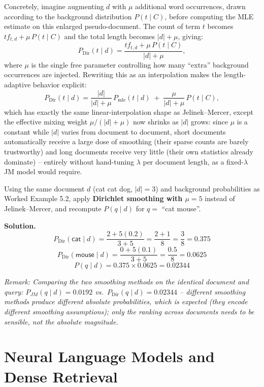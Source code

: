 \documentclass[11pt, a4paper]{article}
\newcommand{\Solution}{\medskip\noindent\textbf{\color{exgreen}Solution.}\ }
\newcommand{\Note}[1]{\par\noindent\textit{\color{darkgray}Remark: #1}\par}
\begin{document}
Concretely, imagine augmenting $d$ with $\mu$ additional word occurrences, drawn according to the background distribution $P(t\mid C)$, before computing the MLE estimate on this enlarged pseudo-document. The count of term $t$ becomes $tf_{t,d} + \mu\,P(t\mid C)$ and the total length becomes $|d|+\mu$, giving:
\[
P_{\text{Dir}}(t\mid d) = \frac{tf_{t,d} + \mu\, P(t\mid C)}{|d| + \mu},
\]
where $\mu$ is the single free parameter controlling how many ``extra'' background occurrences are injected. Rewriting this as an interpolation makes the length-adaptive behavior explicit:
\[
P_{\text{Dir}}(t\mid d) = \frac{|d|}{|d|+\mu}\,P_{\text{mle}}(t\mid d) \;+\; \frac{\mu}{|d|+\mu}\,P(t\mid C),
\]
which has exactly the same linear-interpolation shape as Jelinek--Mercer, except the effective mixing weight $\mu/(|d|+\mu)$ now shrinks as $|d|$ grows: since $\mu$ is a constant while $|d|$ varies from document to document, short documents automatically receive a large dose of smoothing (their sparse counts are barely trustworthy) and long documents receive very little (their own statistics already dominate) -- entirely without hand-tuning $\lambda$ per document length, as a fixed-$\lambda$ JM model would require.

\begin{exercisebox}
Using the same document $d$ (\textsf{cat cat dog}, $|d|=3$) and background probabilities as Worked Example 5.2, apply \textbf{Dirichlet smoothing with $\mu=5$} instead of Jelinek--Mercer, and recompute $P(q\mid d)$ for $q=$ ``\textsf{cat mouse}''.
\end{exercisebox}

\Solution
\[
P_{\text{Dir}}(\textsf{cat}\mid d) = \frac{2 + 5(0.2)}{3+5} = \frac{2+1}{8} = \frac{3}{8} = 0.375
\]
\[
P_{\text{Dir}}(\textsf{mouse}\mid d) = \frac{0 + 5(0.1)}{3+5} = \frac{0.5}{8} = 0.0625
\]
\[
P(q\mid d) = 0.375 \times 0.0625 = 0.02344
\]

\Note{Comparing the two smoothing methods on the identical document and query: $P_{JM}(q\mid d)=0.0192$ vs.\ $P_{\text{Dir}}(q\mid d)=0.02344$ -- different smoothing methods produce different absolute probabilities, which is expected (they encode different smoothing assumptions); only the \emph{ranking} across documents needs to be sensible, not the absolute magnitude.}

\section{Neural Language Models and Dense Retrieval}
\end{document}
